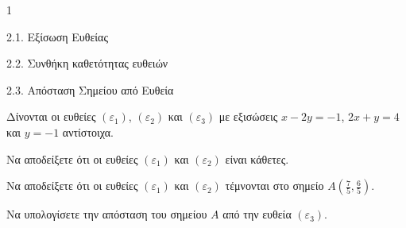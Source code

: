\begin{ylh}{1}
    \item 2.1. Εξίσωση Ευθείας
    \item 2.2. Συνθήκη καθετότητας ευθειών
    \item 2.3. Απόσταση Σημείου από Ευθεία
\end{ylh}
Δίνονται οι ευθείες $(\varepsilon_1)$, $(\varepsilon_2)$ και $(\varepsilon_3)$ με εξισώσεις $x - 2y = -1$, $2x + y = 4$ και $y = -1$ αντίστοιχα.
\begin{alist}
\item Να αποδείξετε ότι οι ευθείες $(\varepsilon_1)$ και $(\varepsilon_2)$ είναι κάθετες. 
\item Να αποδείξετε ότι οι ευθείες $(\varepsilon_1)$ και $(\varepsilon_2)$ τέμνονται στο σημείο $A\left(\frac{7}{5}, \frac{6}{5}\right)$. 
\item Να υπολογίσετε την απόσταση του σημείου $A$ από την ευθεία $(\varepsilon_3)$. 
\end{alist}